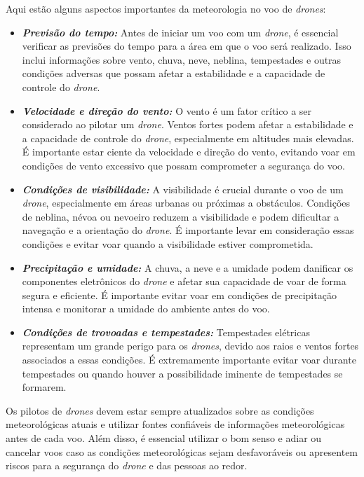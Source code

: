 \documentclass[a4paper, 12pt, onecolumn,singlespacing]{article}
\begin{document}
	Aqui estão alguns aspectos importantes da meteorologia no voo de \textit{drones}:
	\begin{itemize}
		\item \textbf{\textit{Previsão do tempo:}} Antes de iniciar um voo com um \textit{drone}, é essencial verificar as previsões do tempo para a área em que o voo será realizado. Isso inclui informações sobre vento, chuva, neve, neblina, tempestades e outras condições adversas que possam afetar a estabilidade e a capacidade de controle do \textit{drone}.
		
		\item \textbf{\textit{Velocidade e direção do vento:}} O vento é um fator crítico a ser considerado ao pilotar um \textit{drone}. Ventos fortes podem afetar a estabilidade e a capacidade de controle do \textit{drone}, especialmente em altitudes mais elevadas. É importante estar ciente da velocidade e direção do vento, evitando voar em condições de vento excessivo que possam comprometer a segurança do voo.
		
		\item \textbf{\textit{Condições de visibilidade:}} A visibilidade é crucial durante o voo de um \textit{drone}, especialmente em áreas urbanas ou próximas a obstáculos. Condições de neblina, névoa ou nevoeiro reduzem a visibilidade e podem dificultar a navegação e a orientação do \textit{drone}. É importante levar em consideração essas condições e evitar voar quando a visibilidade estiver comprometida.
		
		\item \textbf{\textit{Precipitação e umidade:}} A chuva, a neve e a umidade podem danificar os componentes eletrônicos do \textit{drone} e afetar sua capacidade de voar de forma segura e eficiente. É importante evitar voar em condições de precipitação intensa e monitorar a umidade do ambiente antes do voo.
		
		\item \textbf{\textit{Condições de trovoadas e tempestades:}} Tempestades elétricas representam um grande perigo para os \textit{drones}, devido aos raios e ventos fortes associados a essas condições. É extremamente importante evitar voar durante tempestades ou quando houver a possibilidade iminente de tempestades se formarem.
	\end{itemize}
	
	Os pilotos de \textit{drones} devem estar sempre atualizados sobre as condições meteorológicas atuais e utilizar fontes confiáveis de informações meteorológicas antes de cada voo. Além disso, é essencial utilizar o bom senso e adiar ou cancelar voos caso as condições meteorológicas sejam desfavoráveis ou apresentem riscos para a segurança do \textit{drone} e das pessoas ao redor.
	
\end{document}
